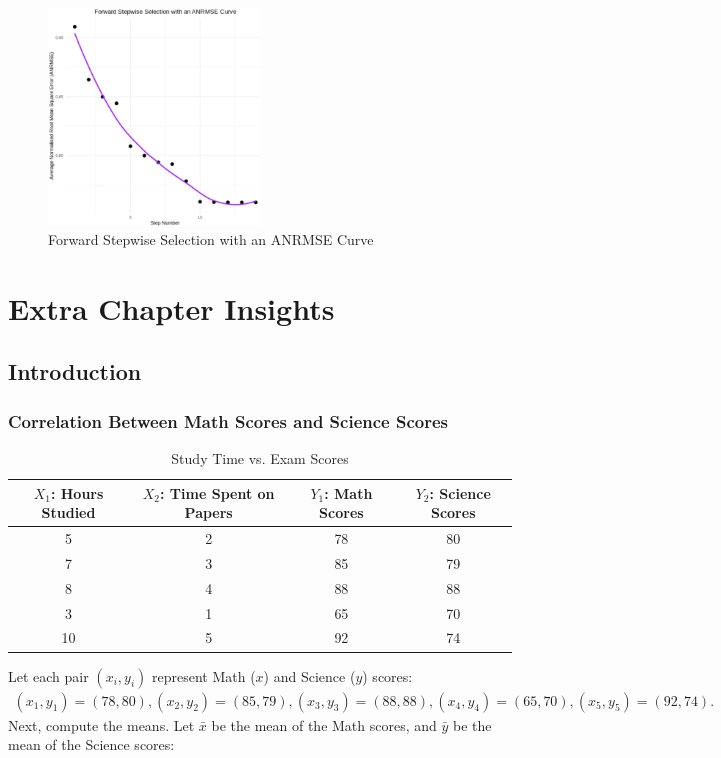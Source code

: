 \documentclass[11pt]{report} %
\begin{document}
\begin{figure}[H]
    \centering
    \includegraphics[width=0.5\textwidth]{Plots/Forward Stepwise Selection Plot.png}
    \caption{Forward Stepwise Selection with an ANRMSE Curve}
    \label{fig:fss}
\end{figure}

\section{Extra Chapter Insights}
\subsection{Introduction}
\subsubsection{Correlation Between Math Scores and Science Scores}
\label{Math Sci Cor}
\setlength{\tabcolsep}{4pt} %
\begin{table}[H]
    \centering
    \begin{tabular}{|c|c|c|c|}
        \hline
        \( X_1 \): Hours Studied & \( X_2 \): Time Spent on Papers & \( Y_1 \): Math Scores & \( Y_2 \): Science Scores\\
        \hline
        5  & 2  & 78 & 80 \\
        7  & 3  & 85 & 79 \\
        8  & 4  & 88 & 88 \\
        3  & 1  & 65 & 70 \\
        10 & 5  & 92 & 74 \\
        \hline
    \end{tabular}
    \caption{Study Time vs. Exam Scores}
    \label{tab:study_scoresA}
\end{table}

Let each pair \((x_i, y_i)\) represent Math (\(x\)) and Science (\(y\)) scores:
\[
\begin{aligned}
(x_1, y_1) = (78, 80),
(x_2, y_2) = (85, 79),
(x_3, y_3) = (88, 88),
(x_4, y_4) = (65, 70),
(x_5, y_5) = (92, 74).
\end{aligned}
\]
Next, compute the means. Let \(\bar{x}\) be the mean of the Math scores, and \(\bar{y}\) be the mean of the Science scores:
\end{document}
